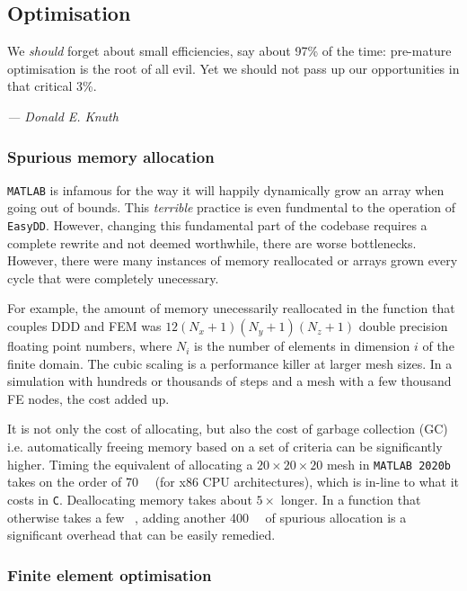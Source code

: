 \subsection{Optimisation}
\renewcommand{\epigraphflush}{flushright}
\renewcommand{\textflush}{flushright}
\setlength{\epigraphwidth}{0.75\linewidth}
\epigraph{We \emph{should} forget about small efficiencies, say about 97\% of the time: pre-mature optimisation is the root of all evil. Yet we should not pass up our opportunities in that critical 3\%.}{\textit{--- Donald E. Knuth \cite[p.~268]{knuth1974structured}}}

\subsubsection{Spurious memory allocation}

\texttt{MATLAB} is infamous for the way it will happily dynamically grow an array when going out of bounds. This \emph{terrible} practice is even fundmental to the operation of \texttt{EasyDD}. However, changing this fundamental part of the codebase requires a complete rewrite and not deemed worthwhile, there are worse bottlenecks. However, there were many instances of memory reallocated or arrays grown every cycle that were completely unecessary.

For example, the amount of memory unecessarily reallocated in the function that couples DDD and FEM was $12(N_x + 1)(N_y + 1)(N_z + 1)$ double precision floating point numbers, where $N_i$ is the number of elements in dimension $i$ of the finite domain. The cubic scaling is a performance killer at larger mesh sizes. In a simulation with hundreds or thousands of steps and a mesh with a few thousand FE nodes, the cost added up.

It is not only the cost of allocating, but also the cost of garbage collection (GC) \cite{hanson1990fast} i.e. automatically freeing memory based on a set of criteria can be significantly higher. Timing the equivalent of allocating a $20 \times 20 \times 20$ mesh in \texttt{MATLAB 2020b} takes on the order of \SI{70}{\micro\sec} (for x86 CPU architectures), which is in-line to what it costs in \texttt{C}. Deallocating memory takes about $5 \times$ longer. In a function that otherwise takes a few \si{\milli\sec}, adding another \SI{400}{\micro\sec} of spurious allocation is a significant overhead that can be easily remedied.


\subsubsection{Finite element optimisation}

